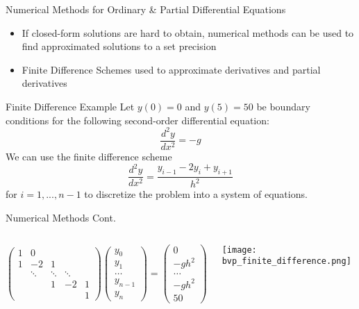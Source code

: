 \documentclass[aspectratio=169,xcolor=dvipsnames]{beamer}
\begin{document}
\begin{frame}{Numerical Methods for Ordinary \& Partial Differential Equations}
\begin{itemize}
    \item If closed-form solutions are hard to obtain, numerical methods can be used to find approximated solutions to a set precision
    \item Finite Difference Schemes used to approximate derivatives and partial derivatives
\end{itemize}
\begin{block}{Finite Difference Example}
Let $y(0)=0$ and $y(5)=50$ be boundary conditions for the following second-order differential equation:
    \begin{equation}
    \frac{d^2y}{dx^2}=-g
    \label{eqn:finite_diff_ex}
\end{equation}
We can use the finite difference scheme
\begin{equation}
    \frac{d^2y}{dx^2}=\frac{y_{i-1}-2y_{i}+y_{i+1}}{h^2}
    \label{eqn:stencil}
\end{equation}
for $i=1,...,n-1$ to discretize the problem into a system of equations.
\end{block}
\end{frame}

\begin{frame}{Numerical Methods Cont.}
    \begin{columns}[c] %

        $\begin{pmatrix}
        1 & 0 &  &  & \\
        1 & -2 & 1 &  & \\
         & \ddots & \ddots & \ddots & \\
         &  & 1 & -2 & 1\\
         &  &  &  & 1
    \end{pmatrix}
    \begin{pmatrix}
        y_{0}\\
        y_{1}\\
        \dots\\
        y_{n-1}\\
        y_{n}
    \end{pmatrix}
    =\begin{pmatrix}
        0\\
        -gh^2\\
        \dots\\
        -gh^2\\
        50
    \end{pmatrix}$

        \centering
        \texttt{[image: bvp\_finite\_difference.png]}

    \end{columns}
\end{frame}
\end{document}
